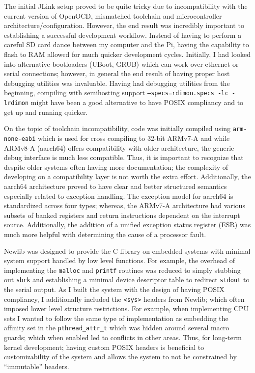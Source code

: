 \documentclass[11pt]{article}
\begin{document}
The initial JLink setup proved to be quite tricky due to incompatibility with the current version of OpenOCD, mismatched toolchain and microcontroller architecture/configuration.  However, the end result was incredibly important to establishing a successful development workflow.  Instead of having to perform a careful SD card dance between my computer and the Pi, having the capability to flash to RAM allowed for much quicker development cycles.  Initially, I had looked into alternative bootloaders (UBoot, GRUB) which can work over ethernet or serial connections; however, in general the end result of having proper host debugging utilities was invaluable. Having had debugging utilities from the beginning, compiling with semihosting support \texttt{--specs=rdimon.specs -lc -lrdimon} might have been a good alternative to have POSIX compliancy and to get up and running quicker.

On the topic of toolchain incompatibility, code was initially compiled using \texttt{arm-none-eabi} which is used for cross compiling to 32-bit ARMv7-A and while ARMv8-A (aarch64) offers compatibility with older architecture, the generic debug interface is much less compatible.  Thus, it is important to recognize that despite older systems often having more documentation; the complexity of developing on a compatibility layer is not worth the extra effort.  Additionally, the aarch64 architecture proved to have clear and better structured semantics especially related to exception handling.  The exception model for aarch64 is standardized across four types; whereas, the ARMv7-A architecture had various subsets of banked registers and return instructions dependent on the interrupt source.  Additionally, the addition of a unified exception status register (ESR) was much more helpful with determining the cause of a processor fault.

Newlib was designed to provide the C library on embedded systems \cite{newlib} with minimal system support handled by low level functions.  For example, the overhead of implementing the \texttt{malloc} and \texttt{printf} routines was reduced to simply stubbing out \texttt{sbrk} and establishing a minimal device descriptor table to redirect \texttt{stdout} to the serial output.  As I built the system with the design of having POSIX compliancy, I additionally included the \texttt{<sys>} headers from Newlib; which often imposed lower level structure restrictions.  For example, when implementing CPU sets I wanted to follow the same type of implementation as embedding the affinity set in the \texttt{pthread\_attr\_t} which was hidden around several macro guards; which when enabled led to conflicts in other areas.  Thus, for long-term kernel development; having custom POSIX headers is beneficial to customizability of the system and allows the system to not be constrained by ``immutable'' headers.
\end{document}
